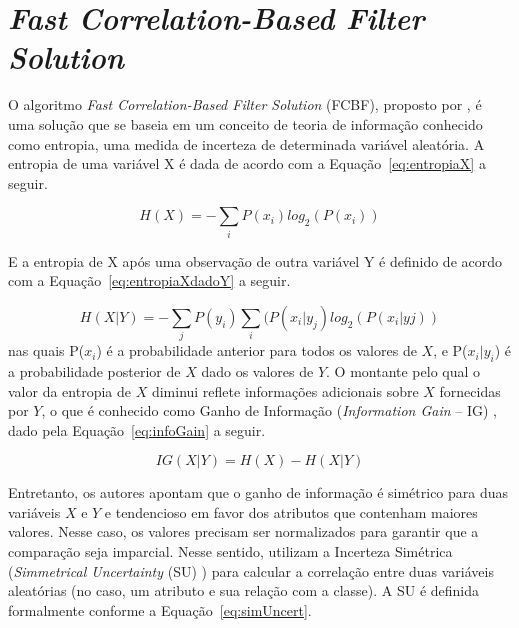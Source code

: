 \section{\textit{Fast Correlation-Based Filter Solution}}\label{sec:fcbf} 

O algoritmo \textit{Fast Correlation-Based Filter Solution} (FCBF), 
proposto por , é uma solução que se baseia em um conceito de teoria de informação conhecido como entropia, uma medida de incerteza de determinada variável aleatória. A entropia de uma variável X é dada  
de acordo com a Equação~\ref{eq:entropiaX} a seguir.

\begin{equation}
H(X) = - \sum_{i} P(x_i) log_2 (P(x_i))
\label{eq:entropiaX}
\end{equation}

E a entropia de X após uma observação de outra variável Y é definido de acordo com a Equação~\ref{eq:entropiaXdadoY} a seguir.

\begin{equation}
H(X|Y) = - \sum_{j} P(y_i) \sum_{i} (P(x_i|y_j) log_2 (P(x_i|yj))
\label{eq:entropiaXdadoY}
\end{equation}
nas quais P($x_i$) é a probabilidade anterior para todos os valores de $X$, e P($x_i|y_i$) é a probabilidade posterior de $X$ dado os valores de $Y$. O montante pelo qual o valor da entropia de $X$ diminui reflete informações adicionais sobre $X$ fornecidas por $Y$, o que é conhecido como Ganho de Informação (\textit{Information Gain} -- IG) \cite{Quinlan1986}, 
dado pela Equação~\ref{eq:infoGain} a seguir.


\begin{equation}
IG(X|Y) = H(X) - H(X|Y)
\label{eq:infoGain}
\end{equation}

Entretanto, os autores apontam que o ganho de informação é simétrico para duas variáveis $X$ e $Y$ e tendencioso em favor dos atributos que contenham maiores valores. Nesse caso, os valores precisam ser normalizados para garantir que a comparação seja imparcial. Nesse sentido,  utilizam a Incerteza Simétrica (\textit{Simmetrical Uncertainty} (SU) ) 
para calcular a correlação entre duas variáveis aleatórias (no caso, um atributo e sua relação com a classe). A SU é definida formalmente conforme a Equação~\ref{eq:simUncert}.

